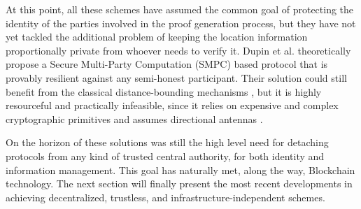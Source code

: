 At this point, all these schemes have assumed the common goal of protecting the identity of the parties involved in the proof generation process, but they have not yet tackled the additional problem of keeping the location information proportionally private from whoever needs to verify it. Dupin et al. \cite{dupin2018location} theoretically propose a Secure Multi-Party Computation (SMPC) based protocol that is provably resilient against any semi-honest participant. Their solution could still benefit from the classical distance-bounding mechanisms \cite{dupin2018location}, but it is highly resourceful and practically infeasible, since it relies on expensive and complex cryptographic primitives and assumes directional antennas \cite{yang2021group}.

On the horizon of these solutions was still the high level need for detaching \pol{} protocols from any kind of trusted central authority, for both identity and information management. This goal has naturally met, along the way, Blockchain technology. The next section will finally present the most recent developments in achieving decentralized, trustless, and infrastructure-independent \pol{} schemes.
